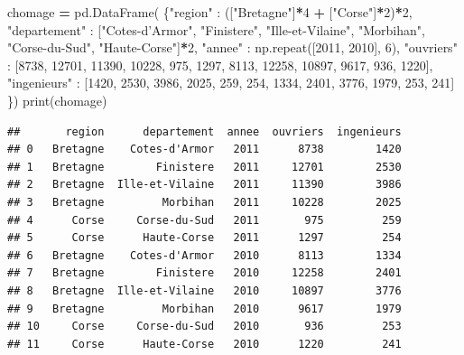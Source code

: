 \documentclass[12pt,]{book}
\newenvironment{Shaded}{\begin{snugshade}}{\end{snugshade}}
\newcommand{\DecValTok}[1]{\textcolor[rgb]{0.00,0.00,0.81}{#1}}
\newcommand{\StringTok}[1]{\textcolor[rgb]{0.31,0.60,0.02}{#1}}
\newcommand{\OperatorTok}[1]{\textcolor[rgb]{0.81,0.36,0.00}{\textbf{#1}}}
\newcommand{\BuiltInTok}[1]{#1}
\newcommand{\NormalTok}[1]{#1}
\numberwithin{equation}{section}
\numberwithin{countremarque}{section}
\begin{document}
\begin{Shaded}
\begin{Highlighting}[]
\NormalTok{chomage }\OperatorTok{=}\NormalTok{ pd.DataFrame(}
\NormalTok{    \{}\StringTok{"region"}\NormalTok{ : ([}\StringTok{"Bretagne"}\NormalTok{]}\OperatorTok{*}\DecValTok{4} \OperatorTok{+}\NormalTok{ [}\StringTok{"Corse"}\NormalTok{]}\OperatorTok{*}\DecValTok{2}\NormalTok{)}\OperatorTok{*}\DecValTok{2}\NormalTok{,}
     \StringTok{"departement"}\NormalTok{ : [}\StringTok{"Cotes-d'Armor"}\NormalTok{, }\StringTok{"Finistere"}\NormalTok{,}
                      \StringTok{"Ille-et-Vilaine"}\NormalTok{, }\StringTok{"Morbihan"}\NormalTok{,}
                      \StringTok{"Corse-du-Sud"}\NormalTok{, }\StringTok{"Haute-Corse"}\NormalTok{]}\OperatorTok{*}\DecValTok{2}\NormalTok{,}
     \StringTok{"annee"}\NormalTok{ : np.repeat([}\DecValTok{2011}\NormalTok{, }\DecValTok{2010}\NormalTok{], }\DecValTok{6}\NormalTok{),}
     \StringTok{"ouvriers"}\NormalTok{ : [}\DecValTok{8738}\NormalTok{, }\DecValTok{12701}\NormalTok{, }\DecValTok{11390}\NormalTok{, }\DecValTok{10228}\NormalTok{, }\DecValTok{975}\NormalTok{, }\DecValTok{1297}\NormalTok{,}
                   \DecValTok{8113}\NormalTok{, }\DecValTok{12258}\NormalTok{, }\DecValTok{10897}\NormalTok{, }\DecValTok{9617}\NormalTok{, }\DecValTok{936}\NormalTok{, }\DecValTok{1220}\NormalTok{],}
     \StringTok{"ingenieurs"}\NormalTok{ : [}\DecValTok{1420}\NormalTok{, }\DecValTok{2530}\NormalTok{, }\DecValTok{3986}\NormalTok{, }\DecValTok{2025}\NormalTok{, }\DecValTok{259}\NormalTok{, }\DecValTok{254}\NormalTok{,}
                     \DecValTok{1334}\NormalTok{, }\DecValTok{2401}\NormalTok{, }\DecValTok{3776}\NormalTok{, }\DecValTok{1979}\NormalTok{, }\DecValTok{253}\NormalTok{, }\DecValTok{241}\NormalTok{]}
\NormalTok{    \})}
\BuiltInTok{print}\NormalTok{(chomage)}
\end{Highlighting}
\end{Shaded}

\begin{lstlisting}
##       region      departement  annee  ouvriers  ingenieurs
## 0   Bretagne    Cotes-d'Armor   2011      8738        1420
## 1   Bretagne        Finistere   2011     12701        2530
## 2   Bretagne  Ille-et-Vilaine   2011     11390        3986
## 3   Bretagne         Morbihan   2011     10228        2025
## 4      Corse     Corse-du-Sud   2011       975         259
## 5      Corse      Haute-Corse   2011      1297         254
## 6   Bretagne    Cotes-d'Armor   2010      8113        1334
## 7   Bretagne        Finistere   2010     12258        2401
## 8   Bretagne  Ille-et-Vilaine   2010     10897        3776
## 9   Bretagne         Morbihan   2010      9617        1979
## 10     Corse     Corse-du-Sud   2010       936         253
## 11     Corse      Haute-Corse   2010      1220         241
\end{lstlisting}
\end{document}
